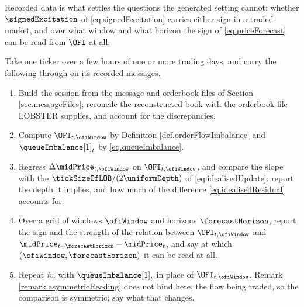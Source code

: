 Recorded data is what settles the questions the generated setting cannot:
whether $\signedExcitation$ of \eqref{eq.signedExcitation} carries either sign
in a traded market,
and over what window and what horizon
the sign of \eqref{eq.priceForecast} can be read from $\OFI$ at all.

\begin{assignment}\label{assignment.orderFlowImbalance}
 Take one ticker over a few hours of one or more trading days,
 and carry the following through on its recorded messages.
 \begin{enumerate}[label={\emph{\roman{*}}.}]
  \item Build the session from the message and orderbook files of
        Section \ref{sec.messageFiles};
        reconcile the reconstructed book with the orderbook file LOBSTER supplies,
        and account for the discrepancies.
  \item Compute $\OFI_{t,\ofiWindow}$ by Definition \ref{def.orderFlowImbalance} and
        $\queueImbalance[1]_{t}$ by \eqref{eq.queueImbalance}.
  \item Regress $\Delta \midPrice_{t,\ofiWindow}$ on $\OFI_{t,\ofiWindow}$,
        and compare the slope with the $\tickSizeOfLOB/(2\uniformDepth)$
        of \eqref{eq.idealisedUpdate}:
        report the depth it implies,
        and how much of the difference \eqref{eq.idealisedResidual} accounts for.
  \item Over a grid of windows $\ofiWindow$ and horizons $\forecastHorizon$,
        report the sign and the strength of the relation between $\OFI_{t,\ofiWindow}$
        and $\midPrice_{t+\forecastHorizon} - \midPrice_{t}$,
        and say at which $(\ofiWindow, \forecastHorizon)$ it can be read at all.
  \item Repeat \emph{iv.} with $\queueImbalance[1]_{t}$ in place of
        $\OFI_{t,\ofiWindow}$.
        Remark \ref{remark.asymmetricReading} does not bind here, the flow being traded,
        so the comparison is symmetric;
        say what that changes.
 \end{enumerate}
\end{assignment}
